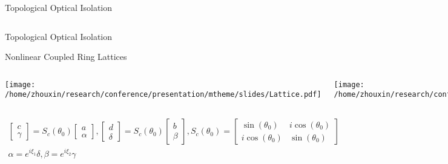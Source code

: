 \documentclass{beamer}
\begin{document}
\begin{frame}{Topological Optical Isolation}
\begin{block}{}
\begin{columns}
         \end{columns}
         \end{block}

\end{frame}

\begin{frame}{Topological Optical Isolation}

         \begin{block}{Nonlinear Coupled Ring Lattices}
         
       \begin{columns}
             \hspace*{0.5em}
             \texttt{[image: /home/zhouxin/research/conference/presentation/mtheme/slides/Lattice.pdf]}\hspace*{-10.5em}
 
            \hspace*{0.5em}
             \texttt{[image: /home/zhouxin/research/conference/presentation/mtheme/slides/band\_psi.pdf]}\hspace*{-10.5em}





         \end{columns}
         \begin{eqnarray}
         \begin{bmatrix}
    c       \\
       \gamma  

\end{bmatrix}=S_c(\theta_0)\begin{bmatrix}
    a       \\
       \alpha  

\end{bmatrix}, \begin{bmatrix}
    d       \\
       \delta  

\end{bmatrix}=S_c(\theta_0)\begin{bmatrix}
    b       \\
       \beta  

\end{bmatrix}, S_c(\theta_0)=\begin{bmatrix}
    \sin(\theta_0) & i\cos(\theta_0)      \\
       i\cos(\theta_0) &  \sin(\theta_0)

\end{bmatrix}\\
\alpha = e^{i\xi_1}\delta, \beta = e^{i\xi_2}\gamma
         \end{eqnarray}
         \end{block}

\end{frame}
\end{document}

